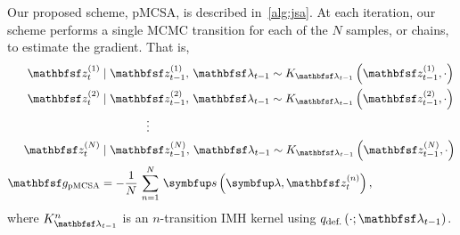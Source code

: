 \begin{proofEnd}

  Our proposed scheme, pMCSA, is described in~\cref{alg:jsa}. 
  At each iteration, our scheme performs a single MCMC transition for each of the \(N\) samples, or chains, to estimate the gradient.
  That is,
  \begin{align*}
    \rvvz^{(1)}_{t} &\mid \rvvz_{t-1}^{(1)},\, \rvvlambda_{t-1} \sim K_{\rvvlambda_{t-1}}\left(\rvvz_{t-1}^{(1)}, \cdot\right) \\
    \rvvz^{(2)}_{t} &\mid \rvvz_{t-1}^{(2)},\, \rvvlambda_{t-1}  \sim K_{\rvvlambda_{t-1}}\left(\rvvz_{t-1}^{(2)}, \cdot\right) \\
    &\qquad\qquad\vdots
    \\
    \rvvz^{(N)}_{t} &\mid \rvvz^{(N)}_{t-1},\, \rvvlambda_{t-1}  \sim K_{\rvvlambda_{t-1}}\left(\rvvz_{t-1}^{(N)}, \cdot\right)
    \\
    \rvvg_{\text{pMCSA}} &= -\frac{1}{N}\,\sum^{N}_{n=1} \, \vs\left(\vlambda, \rvvz^{(n)}_t\right),
  \end{align*}
  where \(K_{\rvvlambda_{t-1}}^n\) is an \(n\)-transition IMH kernel using \(q_{\text{def.}}\left(\cdot; \rvvlambda_{t-1}\right)\).


\end{proofEnd}
